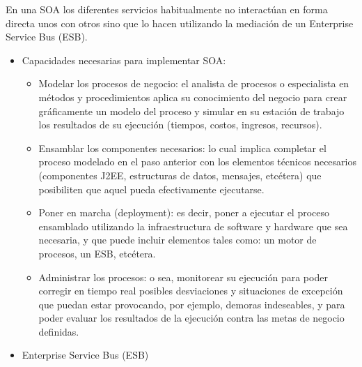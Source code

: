 En una SOA los diferentes servicios habitualmente no interactúan en forma directa unos con otros sino que lo hacen utilizando la mediación de un Enterprise Service Bus (ESB).

\begin{itemize}

\item Capacidades necesarias para implementar SOA:
\begin{itemize}
\item Modelar los procesos de negocio: el analista de procesos o especialista en métodos y procedimientos aplica su conocimiento del negocio para crear gráficamente un modelo del proceso y simular en su estación de trabajo los resultados de su ejecución (tiempos, costos, ingresos, recursos).
\item Ensamblar los componentes necesarios: lo cual implica completar el proceso modelado en el paso anterior con los elementos técnicos necesarios (componentes J2EE, estructuras de datos, mensajes, etcétera) que posibiliten que aquel pueda efectivamente ejecutarse.
\item Poner en marcha (deployment): es decir, poner a ejecutar el proceso ensamblado utilizando la infraestructura de software y hardware que sea necesaria, y que puede incluir elementos tales como: un motor de procesos, un ESB, etcétera.
\item Administrar los procesos: o sea, monitorear su ejecución para poder corregir en tiempo real posibles desviaciones y situaciones de excepción que puedan estar provocando, por ejemplo, demoras indeseables, y para poder evaluar los resultados de la ejecución contra las metas de negocio definidas.
\end{itemize}

\item Enterprise Service Bus (ESB)


\end{itemize}
